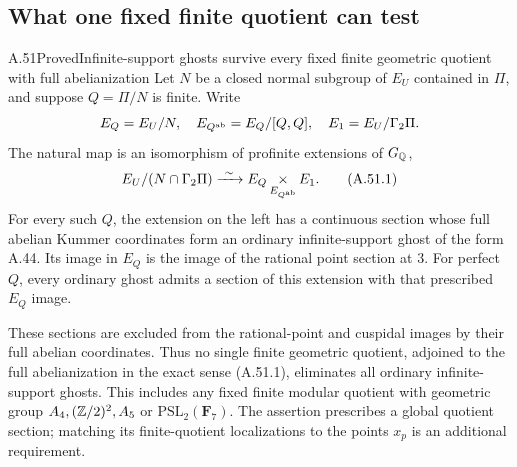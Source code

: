 \subsection{What one fixed finite quotient can test}

\begin{statement}{A.51}{Proved}{Infinite-support ghosts survive every fixed finite geometric quotient with full abelianization}
Let $N$ be a closed normal subgroup of $E_U$ contained in
$\Pi$, and suppose $Q=\Pi/N$ is finite.  Write
\[
 E_Q=E_U/N,\quad E_{Q^{\rm ab}}=E_Q/[Q,Q],\quad
 E_1=E_U/\Gamma_2\Pi.
\]
The natural map is an isomorphism of profinite extensions of
$G_\mathbb Q$,
\[
 E_U/(N\cap\Gamma_2\Pi)
       \xrightarrow{\ \sim\ }
                 E_Q\mathop{\times}_{E_{Q^{\rm ab}}}E_1.
\tag{A.51.1}
\]
For every such $Q$, the extension on the left has a continuous
section whose full abelian Kummer coordinates form an
ordinary infinite-support ghost of the form A.44.  Its image
in $E_Q$ is the image of the rational point section at $3$.
For perfect $Q$, every ordinary ghost admits a section of
this extension with that prescribed $E_Q$ image.

These sections are excluded from the rational-point and
cuspidal images by their full abelian coordinates.  Thus no
single finite geometric quotient, adjoined to the full
abelianization in the exact sense (A.51.1), eliminates all
ordinary infinite-support ghosts.  This includes any fixed
finite modular quotient with geometric group
$A_4,(\mathbb Z/2)^2,A_5$ or $\mathrm{PSL}_2(\mathbf F_7)$.
The assertion prescribes a global quotient section; matching
its finite-quotient localizations to the points $x_p$ is an
additional requirement.
\end{statement}
